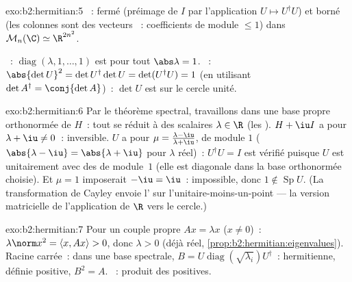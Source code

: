 \begin{solution}{exo:b2:hermitian:5}
~: fermé (préimage de $I$ par l'application  $U \mapsto
U^\dagger U$) et borné (les colonnes sont des vecteurs ~:
coefficients de module $\leq 1$) dans $\mathcal{M}_n(\C) \simeq \R^{2n^2}$.

~: $\operatorname{diag}(\lambda, 1, \dots, 1)$ est 
pour tout $\abs\lambda = 1$. ~: $\abs{\det U}^2 = \det
U^\dagger \det U = \det(U^\dagger U) = 1$ (en utilisant $\det A^\dagger =
\conj{\det A}$)~: $\det U$ est sur le cercle unité.
\end{solution}

\begin{solution}{exo:b2:hermitian:6}
Par le théorème spectral, travaillons dans une base propre orthonormée
de $H$~: tout se réduit à des scalaires $\lambda \in \R$ (les ). $H + \iu I$ a pour  $\lambda + \iu \neq 0$~:
inversible. $U$ a pour  $\mu = \frac{\lambda -
\iu}{\lambda + \iu}$, de module $1$ ($\abs{\lambda - \iu} =
\abs{\lambda + \iu}$ pour $\lambda$ réel)~: $U^\dagger U = I$ est
vérifié puisque $U$ est unitairement  avec des  de module~$1$ (elle est diagonale dans la base orthonormée
choisie). Et $\mu = 1$ imposerait $-\iu = \iu$~: impossible, donc $1
\notin \operatorname{Sp} U$. (La transformation de Cayley envoie
l' sur l'unitaire-moins-un-point --- la version matricielle
de l'application de $\R$ vers le cercle.)
\end{solution}

\begin{solution}{exo:b2:hermitian:7}
Pour un couple propre $Ax = \lambda x$ ($x \neq 0$)~: $\lambda\norm x^2 =
\langle x, Ax\rangle > 0$, donc $\lambda > 0$ (déjà réel,
\cref{prop:b2:hermitian:eigenvalues}). Racine carrée~: dans une base
spectrale, $B = U\operatorname{diag}(\sqrt{\lambda_i})U^\dagger$~:
hermitienne, définie positive, $B^2 = A$. ~: produit des
 positives.
\end{solution}

